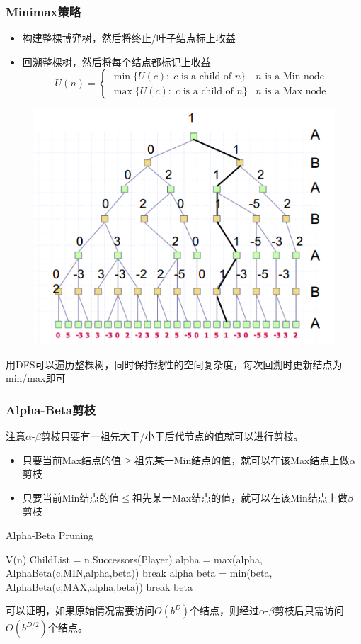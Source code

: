 \subsubsection{Minimax策略}
\begin{itemize}
	\item 构建整棵博弈树，然后将终止/叶子结点标上收益
	\item 回溯整棵树，然后将每个结点都标记上收益
\[U(n)=
\begin{cases}
\min\{U(c):\;c \text{ is a child of } n\} & n \text{ is a Min node}\\
\max\{U(c):\;c \text{ is a child of } n\} & n \text{ is a Max node}
\end{cases}\]
\end{itemize}
\begin{figure}[H]
\centering
\includegraphics[width=0.6\linewidth]{fig/game-tree.png}
\end{figure}

用DFS可以遍历整棵树，同时保持线性的空间复杂度，每次回溯时更新结点为min/max即可

\subsubsection{Alpha-Beta剪枝}
注意$\alpha$-$\beta$剪枝只要有一祖先大于/小于后代节点的值就可以进行剪枝。
\begin{itemize}
	\item 只要当前Max结点的值$\geq$祖先某一Min结点的值，就可以在该Max结点上做$\alpha$剪枝
	\item 只要当前Min结点的值$\leq$祖先某一Max结点的值，就可以在该Min结点上做$\beta$剪枝
\end{itemize}
\begin{algorithm}
\caption{Alpha-Beta Pruning}
\begin{algorithmic}[1]
\State \Return V(n)
\EndIf
\State ChildList = n.Successors(Player)
\State alpha = max(alpha, AlphaBeta(c,MIN,alpha,beta))
\State break
\EndIf
\EndFor
\State \Return alpha
\Else{}
\State beta = min(beta, AlphaBeta(c,MAX,alpha,beta))
\State break
\EndIf
\EndFor
\State \Return beta
\EndIf
\EndProcedure{}
\end{algorithmic}
\end{algorithm}
可以证明，如果原始情况需要访问$O(b^D)$个结点，则经过$\alpha$-$\beta$剪枝后只需访问$O(b^{D/2})$个结点。

